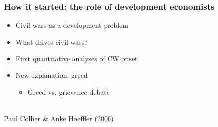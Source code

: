 \documentclass[aspectratio=43]{beamer}
\begin{document}
\begin{frame}
\frametitle{How it started: the role of development economists}
\centering

\begin{minipage}{0.5\textwidth}\centering
\begin{itemize}
  \item Civil wars as a development problem
  \item What drives civil wars?
  \item First quantitative analyses of CW onset
  \item New explanation: greed
  \begin{itemize}
    \item Greed vs. grievance debate
  \end{itemize}
\end{itemize}
\end{minipage}\hfill
\begin{minipage}{0.5\textwidth}\centering
{}\\
{\small Paul Collier \& Anke Hoeffler (2000)}
\end{minipage}

\end{frame}
\end{document}
